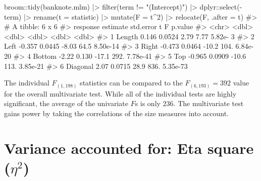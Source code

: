\documentclass[
  letterpaper,
  10pt,
  krantz2]{krantz}
\makeatletter
\newenvironment{Shaded}{\begin{snugshade}}{\end{snugshade}}
\newcommand{\AttributeTok}[1]{\textcolor[rgb]{0.40,0.45,0.13}{#1}}
\newcommand{\CommentTok}[1]{\textcolor[rgb]{0.37,0.37,0.37}{#1}}
\newcommand{\DecValTok}[1]{\textcolor[rgb]{0.68,0.00,0.00}{#1}}
\newcommand{\FunctionTok}[1]{\textcolor[rgb]{0.28,0.35,0.67}{#1}}
\newcommand{\NormalTok}[1]{\textcolor[rgb]{0.00,0.23,0.31}{#1}}
\newcommand{\SpecialCharTok}[1]{\textcolor[rgb]{0.37,0.37,0.37}{#1}}
\newcommand{\StringTok}[1]{\textcolor[rgb]{0.13,0.47,0.30}{#1}}
\newenvironment{kframe}{%
  \medskip{}
  \setlength{\fboxsep}{.8em}
  \def\at@end@of@kframe{}%
  \ifinner\ifhmode%
  \def\at@end@of@kframe{\end{minipage}}%
  \begin{minipage}{\columnwidth}%
  \fi\fi%
  \def\FrameCommand##1{\hskip\@totalleftmargin \hskip-\fboxsep
  \colorbox{shadecolor}{##1}\hskip-\fboxsep
      \hskip-\linewidth \hskip-\@totalleftmargin \hskip\columnwidth}%
  \MakeFramed {\advance\hsize-\width
    \@totalleftmargin\z@ \linewidth\hsize
    \@setminipage}}%
{\par\unskip\endMakeFramed%
  \at@end@of@kframe}
\renewenvironment{Shaded}{\begin{kframe}}{\end{kframe}}
\makeatother
\begin{document}
\begin{Shaded}
\begin{Highlighting}[]
\NormalTok{broom}\SpecialCharTok{::}\FunctionTok{tidy}\NormalTok{(banknote.mlm) }\SpecialCharTok{|\textgreater{}} 
  \FunctionTok{filter}\NormalTok{(term }\SpecialCharTok{!=} \StringTok{"(Intercept)"}\NormalTok{) }\SpecialCharTok{|\textgreater{}}
\NormalTok{  dplyr}\SpecialCharTok{::}\FunctionTok{select}\NormalTok{(}\SpecialCharTok{{-}}\NormalTok{term) }\SpecialCharTok{|\textgreater{}}
  \FunctionTok{rename}\NormalTok{(}\AttributeTok{t =}\NormalTok{ statistic) }\SpecialCharTok{|\textgreater{}}
  \FunctionTok{mutate}\NormalTok{(}\AttributeTok{F =}\NormalTok{ t}\SpecialCharTok{\^{}}\DecValTok{2}\NormalTok{) }\SpecialCharTok{|\textgreater{}}
  \FunctionTok{relocate}\NormalTok{(F, }\AttributeTok{.after =}\NormalTok{ t)}
\CommentTok{\#\textgreater{} \# A tibble: 6 x 6}
\CommentTok{\#\textgreater{}   response estimate std.error      t      F  p.value}
\CommentTok{\#\textgreater{}   \textless{}chr\textgreater{}       \textless{}dbl\textgreater{}     \textless{}dbl\textgreater{}  \textless{}dbl\textgreater{}  \textless{}dbl\textgreater{}    \textless{}dbl\textgreater{}}
\CommentTok{\#\textgreater{} 1 Length      0.146    0.0524   2.79   7.77 5.82e{-} 3}
\CommentTok{\#\textgreater{} 2 Left       {-}0.357    0.0445  {-}8.03  64.5  8.50e{-}14}
\CommentTok{\#\textgreater{} 3 Right      {-}0.473    0.0464 {-}10.2  104.   6.84e{-}20}
\CommentTok{\#\textgreater{} 4 Bottom     {-}2.22     0.130  {-}17.1  292.   7.78e{-}41}
\CommentTok{\#\textgreater{} 5 Top        {-}0.965    0.0909 {-}10.6  113.   3.85e{-}21}
\CommentTok{\#\textgreater{} 6 Diagonal    2.07     0.0715  28.9  836.   5.35e{-}73}
\end{Highlighting}
\end{Shaded}

The individual \(F_{(1, 198)}\) statistics can be compared to the
\(F_{(6, 193)} = 392\) value for the overall multivariate test. While
all of the individual tests are highly significant, the average of the
univariate \(F\)s is only 236. The multivariate test gains power by
taking the correlations of the size measures into account.

\hypertarget{variance-accounted-for-eta-square-eta2}{%
\section{\texorpdfstring{Variance accounted for: Eta square
(\(\eta^2\))}{Variance accounted for: Eta square (\textbackslash eta\^{}2)}}\label{variance-accounted-for-eta-square-eta2}}
\end{document}
